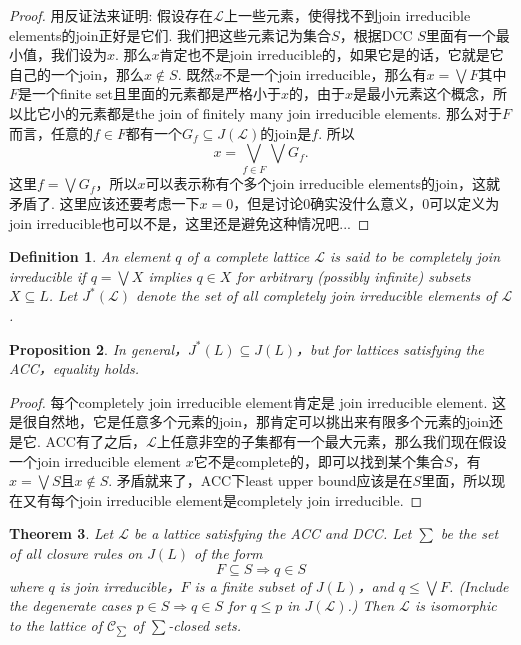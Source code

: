 \documentclass{article}
\newtheorem{theorem}{Theorem}[section]
\newtheorem{proposition}[theorem]{Proposition}
\newtheorem{definition}[theorem]{Definition}
\newcommand\lattice{\mathcal{L}}
\begin{document}
\begin{proof}
用反证法来证明: 假设存在$\lattice$上一些元素，使得找不到join irreducible elements的join正好是它们. 我们把这些元素记为集合$S$，根据DCC $S$里面有一个最小值，我们设为$x$. 那么$x$肯定也不是join irreducible的，如果它是的话，它就是它自己的一个join，那么$x \notin S$. 既然$x$不是一个join irreducible，那么有$x = \bigvee F$其中$F$是一个finite set且里面的元素都是严格小于$x$的，由于$x$是最小元素这个概念，所以比它小的元素都是the join of finitely many join irreducible elements. 那么对于$F$而言，任意的$f \in F$都有一个$G_f \subseteq J(\lattice)$的join是$f$. 所以
$$
x = \bigvee\limits_{f \in F}\bigvee G_f.
$$
这里$f = \bigvee G_f$，所以$x$可以表示称有个多个join irreducible elements的join，这就矛盾了. 这里应该还要考虑一下$x = 0$，但是讨论0确实没什么意义，0可以定义为join irreducible也可以不是，这里还是避免这种情况吧...
\end{proof}

\begin{definition}
\rm An element $q$ of a complete lattice $\lattice$ is said to be {\color{red} completely join irreducible} if $q = \bigvee X$ implies $q \in X$ for arbitrary (possibly infinite) subsets $X \subseteq L$. Let $J^*(\lattice)$ denote the set of all completely join irreducible elements of $\lattice$. 
\end{definition}

\begin{proposition}
\rm In general，$J^{*}(L) \subseteq J(L)$，but for lattices satisfying the ACC，equality holds.
\end{proposition}

\begin{proof}
每个completely join irreducible element肯定是 join irreducible   element. 这是很自然地，它是任意多个元素的join，那肯定可以挑出来有限多个元素的join还是它. ACC有了之后，$\lattice$上任意非空的子集都有一个最大元素，那么我们现在假设一个join irreducible element $x$它不是complete的，即可以找到某个集合$S$，有$x = \bigvee S$且$x \notin S$. 矛盾就来了，ACC下least upper bound应该是在$S$里面，所以现在又有每个join irreducible element是completely join irreducible.
\end{proof}



\begin{theorem}
\rm Let $\lattice$ be a lattice satisfying the ACC and DCC. Let $\sum$ be the set of all closure rules on $J(L)$ of the form
$$
F \subseteq S \Rightarrow q \in S
$$
where $q$ is join irreducible，$F$ is a finite subset of $J(L)$，and $q \leq \bigvee F$. (Include the degenerate cases $p \in S \Rightarrow q \in S$ for $q \leq p$ in $J(\lattice)$.) Then $\lattice$ is isomorphic to the lattice of $\mathcal{C}_{\sum}$ of $\sum$-closed sets.
\end{theorem}
\end{document}
